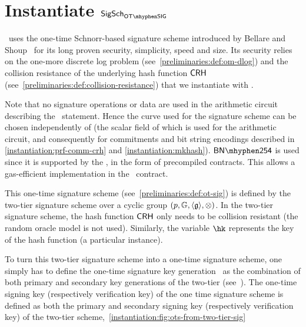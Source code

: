 
\section{Instantiate $\sigscheme_{\otsig}$}\label{instantiation:otsig}

\zeth~uses the one-time Schnorr-based signature scheme introduced by Bellare and Shoup~\cite{bellare2007two} for its long proven security, simplicity, speed and size. Its security relies on the one-more discrete log problem (see~\cref{preliminaries:def:om-dlog}) and the collision resistance of the underlying hash function $\mathsf{CRH}$ (see~\cref{preliminaries:def:collision-resistance}) that we instantiate with .

Note that no signature operations or data are used in the arithmetic circuit describing the \zeth~statement. Hence the curve used for the signature scheme can be chosen independently of \Curve (the scalar field of which is used for the arithmetic circuit, and consequently for commitments and bit string encodings described in \cref{instantiation:prf-comm-crh} and \cref{instantiation:mkhash}). $\BNCurve$ is used since it is supported by the \evm, in the form of precompiled contracts. This allows a gas-efficient implementation in the \mixer~contract.

This one-time signature scheme (see~\cref{preliminaries:def:ot-sig}) is defined by the two-tier signature scheme over a cyclic group $(p, \mathbb{G}, \langle \mathfrak{g} \rangle, \otimes)$.
In the two-tier signature scheme, the hash function $\mathsf{CRH}$ only needs to be collision resistant (the random oracle model is not used). Similarly, the variable $\hk$ represents the key of the hash function (a particular instance).

To turn this two-tier signature scheme into a one-time signature scheme, one simply has to define the one-time signature key generation \kgen~as the combination of both primary and secondary key generations of the two-tier (see~\cite[Section 6]{bellare2007two}). The one-time signing key (respectively verification key) of the one time signature scheme is defined as both the primary and secondary signing key (respectively verification key) of the two-tier scheme,~\cref{instantiation:fig:ots-from-two-tier-sig}

